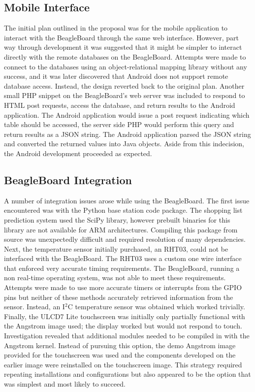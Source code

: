 \documentclass[11pt]{article} %
\begin{document}
\subsection{Mobile Interface}
The initial plan outlined in the proposal was for the mobile application to interact with the BeagleBoard through the same web interface. However, part way through development it was suggested that it might be simpler to interact directly with the remote databases on the BeagleBoard. Attempts were made to connect to the databases using an object-relational mapping library without any success, and it was later discovered that Android does not support remote database access. Instead, the design reverted back to the original plan. Another small PHP snippet on the BeagleBoard's web server was included to respond to HTML post requests, access the database, and return results to the Android application. The Android application would issue a post request indicating which table should be accessed, the server side PHP would perform this query and return results as a JSON string. The Android application parsed the JSON string and converted the returned values into Java objects. Aside from this indecision, the Android development proceeded as expected.

\subsection{BeagleBoard Integration}
A number of integration issues arose while using the BeagleBoard. The first issue encountered was with the Python base station code package. The shopping list prediction system used the SciPy library, however prebuilt binaries for this library are not available for ARM architectures. Compiling this package from source was unexpectedly difficult and required resolution of many dependencies. Next, the temperature sensor initially purchased, an RHT03, could not be interfaced with the BeagleBoard. The RHT03 uses a custom one wire interface that enforced very accurate timing requirements. The BeagleBoard, running a non real-time operating system, was not able to meet these requirements. Attempts were made to use more accurate timers or interrupts from the GPIO pins but neither of these methods accurately retrieved information from the sensor. Instead, an I$^2$C temperature sensor was obtained which worked trivially. Finally, the ULCD7 Lite touchscreen was initially only partially functional with the Angstrom image used; the display worked but would not respond to touch. Investigation revealed that additional modules needed to be compiled in with the Angstrom kernel. Instead of pursuing this option, the demo Angstrom image provided for the touchscreen was used and the components developed on the earlier image were reinstalled on the touchscreen image. This strategy required repeating installations and configurations but also appeared to be the option that was simplest and most likely to succeed.
\end{document}
